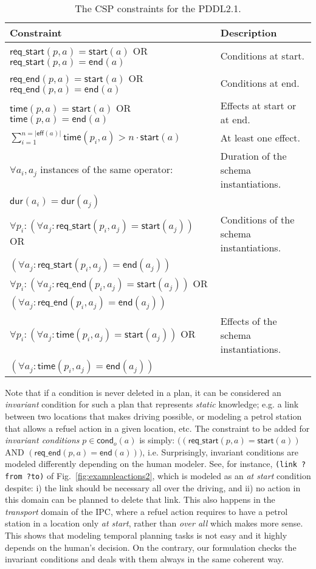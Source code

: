 \documentclass{ecai}
\newcommand{\eff}{\mathsf{eff}}    %
\newcommand{\cond}{\mathsf{cond}}  %
\newcommand{\dur}{\mathsf{dur}}    %
\newcommand{\start}{\mathsf{start}}%
\newcommand{\en}{\mathsf{end}}     %
\newcommand{\tim}{\mathsf{time}}   %
\newcommand{\reqs}{\mathsf{req\_{start}}} %
\newcommand{\reqe}{\mathsf{req\_{end}}}   %
\begin{document}
\begin{table}
\setlength\extrarowheight{2pt}    
\begin{scriptsize}
\begin{tabular}{ll}
{\bf Constraint} & {\bf Description} \\\hline
$\reqs(p,a) = \start(a)$ OR $\reqs(p,a) = \en(a)$ & Conditions at start.\\
$\reqe(p,a) = \start(a)$ OR $\reqe(p,a) = \en(a)$ & Conditions at end.\\
$\tim(p,a) = \start(a)$ OR $\tim(p,a) = \en(a)$ & Effects at start or at end.\\
$\sum_{i=1}^{n =|\eff(a)|} \tim(p_i,a) > n \cdot \start(a)$ & At least one effect.\\
$\forall a_i,a_j$ instances of the same operator: & Duration of the schema instantiations.\\
$\dur(a_i) = \dur(a_j)$ &\\

$\forall p_i: (\forall a_j: \reqs(p_i,a_j) = \start(a_j))$ OR & Conditions of the schema instantiations.\\
$(\forall a_j: \reqs(p_i,a_j) = \en(a_j))$ & \\

$\forall p_i: (\forall a_j: \reqe(p_i,a_j) = \start(a_j))$ OR  & \\
$(\forall a_j: \reqe(p_i,a_j) = \en(a_j))$ & \\
$\forall p_i: (\forall a_j: \tim(p_i,a_j) = \start(a_j))$ OR  & Effects of the schema instantiations.\\
$(\forall a_j: \tim(p_i,a_j) = \en(a_j))$ &
\end{tabular}
\end{scriptsize}
\caption{\small The CSP constraints for the PDDL2.1.}
\label{table:21constraints}
\end{table}

Note that if a condition is never deleted in a plan, it can be considered an {\em invariant} condition for such a plan that represents {\em static} knowledge; e.g. a link between two locations that makes driving possible, or modeling a petrol station that allows a refuel action in a given location, etc. The constraint to be added for {\em invariant conditions} $p \in \cond_o(a)$ is simply: $((\reqs(p,a) = \start(a))$ AND $(\reqe(p,a) = \en(a)))$, i.e. Surprisingly, invariant conditions are modeled differently depending on the human modeler. See, for instance, \texttt{(link ?from ?to)} of Fig.~\ref{fig:exampleactions2}, which is modeled as an \emph{at start} condition despite: i) the link should be necessary all over the driving, and ii) no action in this domain can be planned to delete that link.
This also happens in the \emph{transport} domain of the IPC, where a refuel action requires to have a petrol station in a location only \emph{at start}, rather than \emph{over all} which makes more sense. This shows that modeling temporal planning tasks is not easy and it highly depends on the human's decision. On the contrary, our formulation checks the invariant conditions and deals with them always in the same coherent way.
\end{document}
